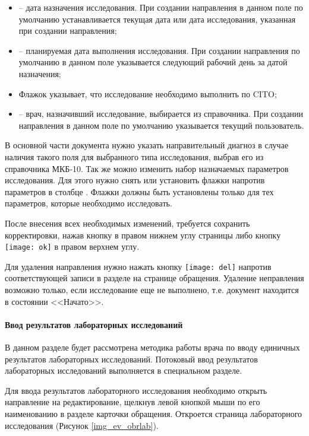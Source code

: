 {\begin{itemize}
 \item {} -- дата назначения исследования. При создании направления в данном поле по умолчанию устанавливается текущая дата или дата исследования, указанная при создании направления;
 \item {} -- планируемая дата выполнения исследования. При создании направления по умолчанию в данном поле указывается следующий рабочий день за датой назначения;
 \item Флажок  указывает, что исследование необходимо выполнить по CITO;
 \item {} -- врач, назначивший исследование, выбирается из справочника. При создании направления в данном поле по умолчанию указывается текущий пользователь.  
\end{itemize} 

В основной части документа нужно указать направительный диагноз в случае наличия такого поля для выбранного типа исследования, выбрав его из справочника МКБ-10. Так же можно изменить набор назначаемых параметров исследования. Для этого нужно снять или установить флажки напротив параметров в столбце . Флажки должны быть установлены только для тех параметров, которые необходимо исследовать.  

После внесения всех необходимых изменений, требуется сохранить корректировки, нажав кнопку  в правом нижнем углу страницы либо кнопку \texttt{[image: ok]} в правом верхнем углу.    

Для удаления направления нужно нажать кнопку \texttt{[image: del]} напротив соответствующей записи в разделе  на странице обращения. Удаление неправления возможно только, если исследование еще не выполнено, т.е. документ находится в состоянии <<Начато>>.

{
\paragraph{Ввод результатов лабораторных исследований} \label{ev_obr_rez}
 
В данном разделе будет рассмотрена методика работы врача по вводу единичных результатов лабораторных исследований. Потоковый ввод результатов лабораторных исследований выполняется в специальном разделе.

Для ввода результатов лабораторного исследования необходимо открыть направление на редактирование, щелкнув левой кнопкой мыши по его наименованию в разделе  карточки обращения. Откроется страница лабораторного исследования (Рисунок \ref{img_ev_obrlab}). 

}}
